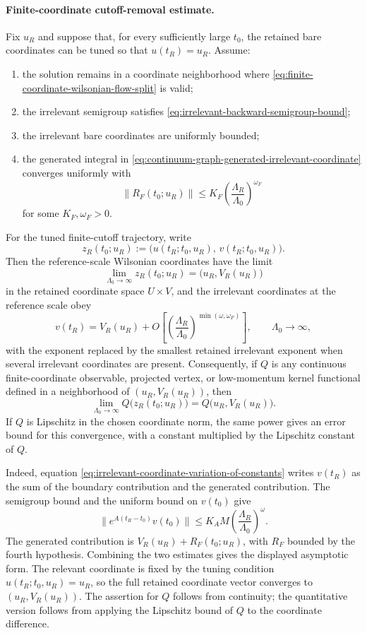 \paragraph{Finite-coordinate cutoff-removal estimate.}
Fix \(u_R\) and suppose that, for every sufficiently large \(t_0\), the
retained bare coordinates can be tuned so that \(u(t_R)=u_R\).  Assume:
\begin{enumerate}[label=(\roman*)]
  \item the solution remains in a coordinate neighborhood where
  \eqref{eq:finite-coordinate-wilsonian-flow-split} is valid;
  \item the irrelevant semigroup satisfies
  \eqref{eq:irrelevant-backward-semigroup-bound};
  \item the irrelevant bare coordinates are uniformly bounded;
  \item the generated integral in
  \eqref{eq:continuum-graph-generated-irrelevant-coordinate} converges
  uniformly with
  \[
    \|R_F(t_0;u_R)\|
    \leq
    K_F\left(\frac{\Lambda_R}{\Lambda_0}\right)^{\omega_F}
  \]
  for some \(K_F,\omega_F>0\).
\end{enumerate}
For the tuned finite-cutoff trajectory, write
\[
  z_R(t_0;u_R)
  :=
  \bigl(u(t_R;t_0,u_R),\,v(t_R;t_0,u_R)\bigr).
\]
Then the reference-scale Wilsonian coordinates have the limit
\begin{equation}
  \lim_{\Lambda_0\to\infty}z_R(t_0;u_R)
  =
  \bigl(u_R,V_R(u_R)\bigr)
  \label{eq:finite-coordinate-wilsonian-continuum-limit}
\end{equation}
in the retained coordinate space \(U\times V\), and the irrelevant
coordinates at the reference scale obey
\[
  v(t_R)
  =
  V_R(u_R)
  +
  O\!\left[
    \left(\frac{\Lambda_R}{\Lambda_0}\right)^{\min(\omega,\omega_F)}
  \right],
  \qquad
  \Lambda_0\to\infty ,
\]
with the exponent replaced by the smallest retained irrelevant exponent when
several irrelevant coordinates are present.
Consequently, if \(Q\) is any continuous finite-coordinate observable,
projected vertex, or low-momentum kernel functional defined in a neighborhood
of \((u_R,V_R(u_R))\), then
\[
  \lim_{\Lambda_0\to\infty}Q\bigl(z_R(t_0;u_R)\bigr)
  =
  Q\bigl(u_R,V_R(u_R)\bigr).
\]
If \(Q\) is Lipschitz in the chosen coordinate norm, the same power gives an
error bound for this convergence, with a constant multiplied by the Lipschitz
constant of \(Q\).

Indeed, equation \eqref{eq:irrelevant-coordinate-variation-of-constants} writes
\(v(t_R)\) as the sum of the boundary contribution and the generated
contribution.  The semigroup bound and the uniform bound on \(v(t_0)\) give
\[
  \|e^{A(t_R-t_0)}v(t_0)\|
  \leq
  K_A M\left(\frac{\Lambda_R}{\Lambda_0}\right)^\omega .
\]
The generated contribution is \(V_R(u_R)+R_F(t_0;u_R)\), with \(R_F\)
bounded by the fourth hypothesis.  Combining the two estimates gives the
displayed asymptotic form.  The relevant coordinate is fixed by the tuning
condition \(u(t_R;t_0,u_R)=u_R\), so the full retained coordinate vector
converges to \((u_R,V_R(u_R))\).  The assertion for \(Q\) follows from
continuity; the quantitative version follows from applying the Lipschitz
bound of \(Q\) to the coordinate difference.

